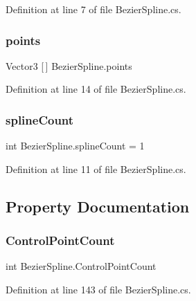Definition at line 7 of file Bezier\+Spline.\+cs.

\mbox{\label{class_bezier_spline_adda54d62157465856c511f0b94fd78d9}} 
\subsubsection{\texorpdfstring{points}{points}}
{\footnotesize\ttfamily Vector3 \mbox{[}$\,$\mbox{]} Bezier\+Spline.\+points}



Definition at line 14 of file Bezier\+Spline.\+cs.

\mbox{\label{class_bezier_spline_ad070f5934fd8050759032c828c9c242d}} 
\subsubsection{\texorpdfstring{spline\+Count}{splineCount}}
{\footnotesize\ttfamily int Bezier\+Spline.\+spline\+Count = 1}



Definition at line 11 of file Bezier\+Spline.\+cs.



\subsection{Property Documentation}
\mbox{\label{class_bezier_spline_acb5b34c12c98bdf6b0ec0917009b1626}} 
\subsubsection{\texorpdfstring{Control\+Point\+Count}{ControlPointCount}}
{\footnotesize\ttfamily int Bezier\+Spline.\+Control\+Point\+Count\hspace{0.3cm}{\ttfamily [get]}}



Definition at line 143 of file Bezier\+Spline.\+cs.


